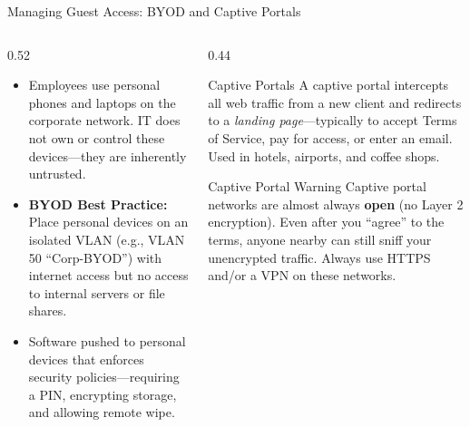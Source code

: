 \documentclass[aspectratio=169]{beamer}
\begin{document}
\begin{frame}{Managing Guest Access: BYOD and Captive Portals}
    \begin{columns}[T]
        \begin{column}{0.52\textwidth}
            \footnotesize
            \begin{itemize}
                \item {} Employees use personal phones and laptops on the corporate network. IT does not own or control these devices---they are inherently untrusted.
                \item \textbf{BYOD Best Practice:} Place personal devices on an isolated VLAN (e.g., VLAN 50 ``Corp-BYOD'') with internet access but no access to internal servers or file shares.
                \item {} Software pushed to personal devices that enforces security policies---requiring a PIN, encrypting storage, and allowing remote wipe.
            \end{itemize}
        \end{column}
        \begin{column}{0.44\textwidth}
            \begin{block}{Captive Portals}
                \footnotesize
                A captive portal intercepts all web traffic from a new client and redirects to a \emph{landing page}---typically to accept Terms of Service, pay for access, or enter an email. Used in hotels, airports, and coffee shops.
            \end{block}
            \vspace{0.3em}
            \begin{alertblock}{Captive Portal Warning}
                \footnotesize
                Captive portal networks are almost always \textbf{open} (no Layer 2 encryption). Even after you ``agree'' to the terms, anyone nearby can still sniff your unencrypted traffic. Always use HTTPS and/or a VPN on these networks.
            \end{alertblock}
        \end{column}
    \end{columns}
\end{frame}

\end{document}
